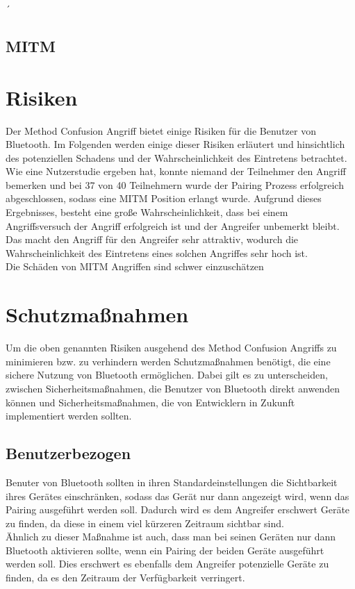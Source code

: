 ´\documentclass[
    a4paper,
    pagesize,
    pdftex,
    12pt,
]{scrartcl}
\begin{document}
    \subsection{MITM}

    \newpage
    \section{Risiken}
    Der Method Confusion Angriff bietet einige Risiken für die Benutzer von Bluetooth. Im Folgenden werden einige dieser Risiken erläutert und hinsichtlich des potenziellen Schadens und der Wahrscheinlichkeit des Eintretens betrachtet. \\
    Wie eine Nutzerstudie ergeben hat, konnte niemand der Teilnehmer den Angriff bemerken und bei 37 von 40 Teilnehmern wurde der Pairing Prozess erfolgreich abgeschlossen, sodass eine MITM Position erlangt wurde. \cite{method_confusion_attack} Aufgrund dieses Ergebnisses, besteht eine große Wahrscheinlichkeit, dass bei einem Angriffsversuch der Angriff erfolgreich ist und der Angreifer unbemerkt bleibt. Das macht den Angriff für den Angreifer sehr attraktiv, wodurch die Wahrscheinlichkeit des Eintretens eines solchen Angriffes sehr hoch ist. \\
    Die Schäden von MITM Angriffen sind schwer einzuschätzen

    \newpage
    \section{Schutzmaßnahmen}
    Um die oben genannten Risiken ausgehend des Method Confusion Angriffs zu minimieren bzw. zu verhindern werden Schutzmaßnahmen benötigt, die eine sichere Nutzung von Bluetooth ermöglichen. Dabei gilt es zu unterscheiden, zwischen Sicherheitsmaßnahmen, die Benutzer von Bluetooth direkt anwenden können und Sicherheitsmaßnahmen, die von Entwicklern in Zukunft implementiert werden sollten.
\subsection{Benutzerbezogen}
    Benuter von Bluetooth sollten in ihren Standardeinstellungen die Sichtbarkeit ihres Gerätes einschränken, sodass das Gerät nur dann angezeigt wird, wenn das Pairing ausgeführt werden soll. Dadurch wird es dem Angreifer erschwert Geräte zu finden, da diese in einem viel kürzeren Zeitraum sichtbar sind. \\
    Ähnlich zu dieser Maßnahme ist auch, dass man bei seinen Geräten nur dann Bluetooth aktivieren sollte, wenn ein Pairing der beiden Geräte ausgeführt werden soll. Dies erschwert es ebenfalls dem Angreifer potenzielle Geräte zu finden, da es den Zeitraum der Verfügbarkeit verringert. \cite{bluetooth_newest_security_risks}
\end{document}
